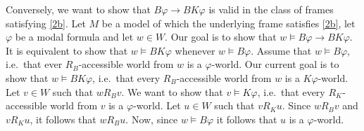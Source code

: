 \documentclass{article}
\begin{document}
\begin{ex}
\begin{enumerate}
Conversely, we want to show that $B\varphi\to BK\varphi$ is valid in the class 
of frames satisfying \ref{2b}. Let $M$ be a model of which the underlying frame
satisfies \ref{2b}, let $\varphi$ be a modal formula and let $w\in W$. Our goal
is to show that $w\models B\varphi\to BK\varphi$. It is equivalent to show that
$w\models BK\varphi$ whenever $w\models B\varphi$. Assume that $w\models B\varphi$,
i.e.~that ever $R_B$-accessible world from $w$ is a $\varphi$-world. Our current
goal is to show that $w\models BK\varphi$, i.e.~that every $R_B$-accessible world
from $w$ is a $K\varphi$-world. Let $v\in W$ such that $w\mathbin{R_B}v$. We
want to show that $v\models K\varphi$, i.e.~that every $R_K$-accessible world from
$v$ is a $\varphi$-world. Let $u\in W$ such that $v\mathbin{R_K} u$. Since
$w\mathbin{R_B} v$ and $v\mathbin{R_K} u$, it follows that $w\mathbin{R_B} u$.
Now, since $w\models B\varphi$ it follows that $u$ is a $\varphi$-world.
\end{enumerate}
\end{ex}
\end{document}
